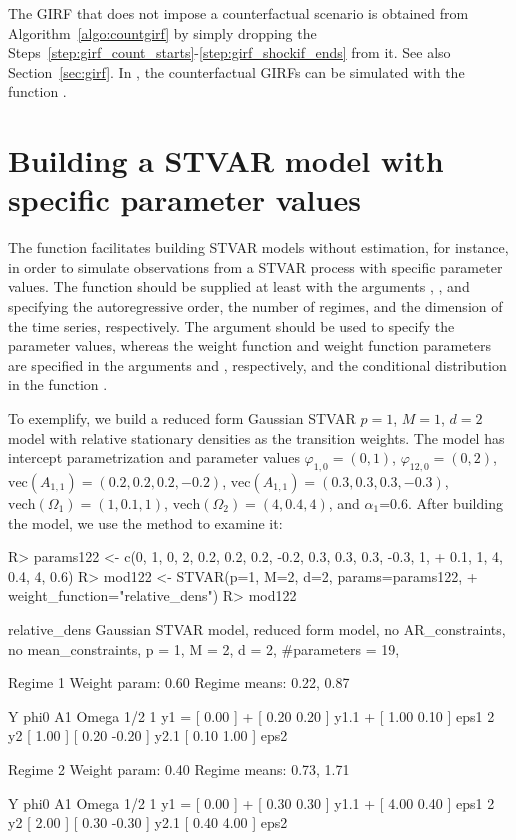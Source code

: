 \documentclass[nojss]{jss}
\begin{document}
The GIRF that does not impose a counterfactual scenario is obtained from Algorithm~\ref{algo:countgirf} by simply dropping the Steps~\ref{step:girf_count_starts}-\ref{step:girf_shockif_ends} from it. See also Section~\ref{sec:girf}. In , the counterfactual GIRFs can be simulated with the function .


\section{Building a STVAR model with specific parameter values}\label{sec:STVAR}

The function  facilitates building STVAR models without estimation, for instance, in order to simulate observations from a STVAR process with specific parameter values. The function should be supplied at least with the arguments , , and  specifying the autoregressive order, the number of regimes, and the dimension of the time series, respectively. The argument  should be used to specify the parameter values, whereas the weight function and weight function parameters are specified in the arguments  and , respectively, and the conditional distribution in the function .

To exemplify, we build a reduced form Gaussian STVAR $p=1$, $M=1$, $d=2$ model with relative stationary densities as the transition weights. The model has intercept parametrization and parameter values $\varphi_{1,0}=(0, 1)$, $\varphi_{12,0}=(0, 2)$, $\text{vec}(A_{1,1}) = (0.2, 0.2, 0.2, -0.2)$, $\text{vec}(A_{1,1}) = (0.3, 0.3, 0.3, -0.3)$, $\text{vech}(\Omega_1) = (1, 0.1, 1)$, $\text{vech}(\Omega_2) = (4, 0.4, 4)$, and $\alpha_1$=0.6. After building the model, we use the  method to examine it:
%
\begin{CodeChunk}
\begin{CodeInput}
R> params122 <- c(0, 1, 0, 2, 0.2, 0.2, 0.2, -0.2, 0.3, 0.3, 0.3, -0.3, 1,
+    0.1, 1, 4, 0.4, 4, 0.6)
R> mod122 <- STVAR(p=1, M=2, d=2, params=params122,
+    weight_function="relative_dens")
R> mod122
\end{CodeInput}
\begin{CodeOutput}
relative_dens Gaussian STVAR model, reduced form model, no AR_constraints,
no mean_constraints,
  p = 1, M = 2, d = 2, #parameters = 19,

Regime 1
Weight param: 0.60
Regime means: 0.22, 0.87

   Y     phi0          A1                  Omega        1/2
1 y1 = [ 0.00 ] + [  0.20  0.20 ] y1.1 + [  1.00 0.10 ]     eps1
2 y2   [ 1.00 ]   [  0.20 -0.20 ] y2.1   [  0.10 1.00 ]     eps2

Regime 2
Weight param: 0.40
Regime means: 0.73, 1.71

   Y     phi0          A1                  Omega        1/2
1 y1 = [ 0.00 ] + [  0.30  0.30 ] y1.1 + [  4.00 0.40 ]     eps1
2 y2   [ 2.00 ]   [  0.30 -0.30 ] y2.1   [  0.40 4.00 ]     eps2
\end{CodeOutput}
\end{CodeChunk}
%
\end{document}
